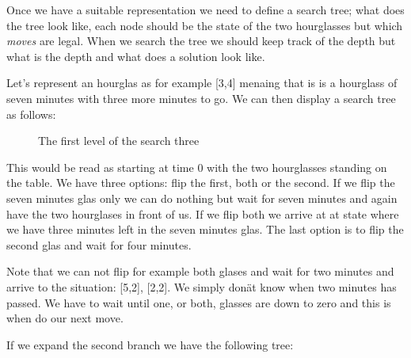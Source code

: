 \documentclass[a4paper,11pt]{article}
\begin{document}
Once we have a suitable representation we need to define a search
tree; what does the tree look like, each node should be the state of
the two hourglasses but which {\em moves} are legal. When we search
the tree we should keep track of the depth but what is the depth and
what does a solution look like.

Let's represent an hourglas as for example [3,4] menaing that is is a
hourglass of seven minutes with three more minutes to go. We can then
display a search tree as follows:

\begin{figure}[h]
\center
{}
\caption{The first level of the search three}
\end{figure}

This would be read as starting at time $0$ with the two hourglasses
standing on the table. We have three options: flip the first, both or
the second. If we flip the seven minutes glas only we can do nothing
but wait for seven minutes and again have the two hourglases in front
of us. If we flip both we arrive at at state where we have three
minutes left in the seven minutes glas. The last option is to flip the second glas and wait for four minutes.

Note that we can not flip for example both glases and wait for two
minutes and arrive to the situation: [5,2], [2,2]. We simply donät
know when two minutes has passed. We have to wait until one, or both,
glasses are down to zero and this is when do our next move.

If we expand the second branch we have the following tree:
\end{document}

